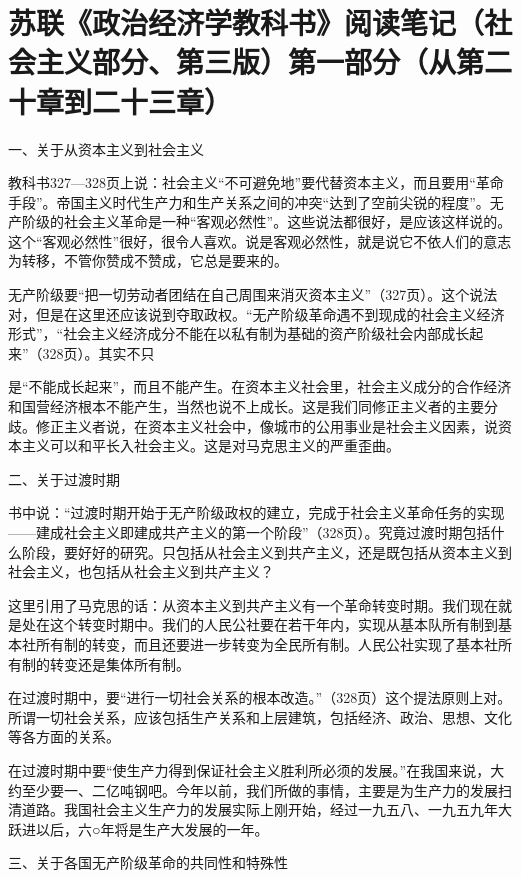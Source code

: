 \section[苏联《政治经济学教科书》阅读笔记（社会主义部分、第三版）第一部分（从第二十章到二十三章）]{苏联《政治经济学教科书》阅读笔记（社会主义部分、第三版）第一部分（从第二十章到二十三章）}


一、关于从资本主义到社会主义

教科书327—328页上说：社会主义“不可避免地”要代替资本主义，而且要用“革命手段”。帝国主义时代生产力和生产关系之间的冲突“达到了空前尖锐的程度”。无产阶级的社会主义革命是一种“客观必然性”。这些说法都很好，是应该这样说的。这个“客观必然性”很好，很令人喜欢。说是客观必然性，就是说它不依人们的意志为转移，不管你赞成不赞成，它总是要来的。

无产阶级要“把一切劳动者团结在自己周围来消灭资本主义”（327页）。这个说法对，但是在这里还应该说到夺取政权。“无产阶级革命遇不到现成的社会主义经济形式”，“社会主义经济成分不能在以私有制为基础的资产阶级社会内部成长起来”（328页）。其实不只

是“不能成长起来”，而且不能产生。在资本主义社会里，社会主义成分的合作经济和国营经济根本不能产生，当然也说不上成长。这是我们同修正主义者的主要分歧。修正主义者说，在资本主义社会中，像城市的公用事业是社会主义因素，说资本主义可以和平长入社会主义。这是对马克思主义的严重歪曲。

二、关于过渡时期

书中说：“过渡时期开始于无产阶级政权的建立，完成于社会主义革命任务的实现——建成社会主义即建成共产主义的第一个阶段”（328页）。究竟过渡时期包括什么阶段，要好好的研究。只包括从社会主义到共产主义，还是既包括从资本主义到社会主义，也包括从社会主义到共产主义？

这里引用了马克思的话：从资本主义到共产主义有一个革命转变时期。我们现在就是处在这个转变时期中。我们的人民公社要在若干年内，实现从基本队所有制到基本社所有制的转变，而且还要进一步转变为全民所有制。人民公社实现了基本社所有制的转变还是集体所有制。

在过渡时期中，要“进行一切社会关系的根本改造。”（328页）这个提法原则上对。所谓一切社会关系，应该包括生产关系和上层建筑，包括经济、政治、思想、文化等各方面的关系。

在过渡时期中要“使生产力得到保证社会主义胜利所必须的发展。”在我国来说，大约至少要一、二亿吨钢吧。今年以前，我们所做的事情，主要是为生产力的发展扫清道路。我国社会主义生产力的发展实际上刚开始，经过一九五八、一九五九年大跃进以后，六○年将是生产大发展的一年。

三、关于各国无产阶级革命的共同性和特殊性

